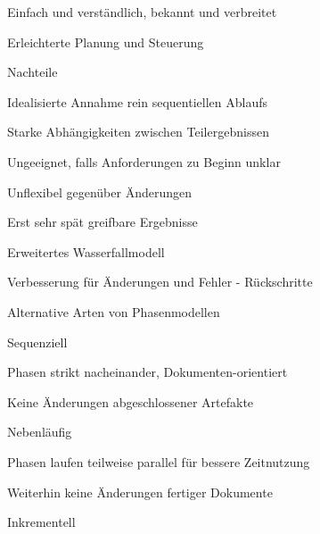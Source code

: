 \documentclass[a4paper]{article}
\begin{document}
\begin{multicols}{3}
\begin{itemize*}
\begin{itemize*}
                  \begin{itemize*}
                    \item Einfach und verständlich, bekannt und verbreitet
                    \item Erleichterte Planung und Steuerung
                  \end{itemize*}
            \item Nachteile
                  \begin{itemize*}
                    \item Idealisierte Annahme rein sequentiellen Ablaufs
                    \item Starke Abhängigkeiten zwischen Teilergebnissen
                    \item Ungeeignet, falls Anforderungen zu Beginn unklar
                    \item Unflexibel gegenüber Änderungen
                    \item Erst sehr spät greifbare Ergebnisse
                  \end{itemize*}
          \end{itemize*}
    \item Erweitertes Wasserfallmodell
          \begin{itemize*}
            \item Verbesserung für Änderungen und Fehler - Rückschritte
          \end{itemize*}
    \item Alternative Arten von Phasenmodellen
          \begin{itemize*}
            \item Sequenziell
                  \begin{itemize*}
                    \item Phasen strikt nacheinander, Dokumenten-orientiert
                    \item Keine Änderungen abgeschlossener Artefakte
                  \end{itemize*}
            \item Nebenläufig
                  \begin{itemize*}
                    \item Phasen laufen teilweise parallel für bessere Zeitnutzung
                    \item Weiterhin keine Änderungen fertiger Dokumente
                  \end{itemize*}
            \item Inkrementell

\end{itemize*}
\end{itemize*}
\end{multicols}
\end{document}
